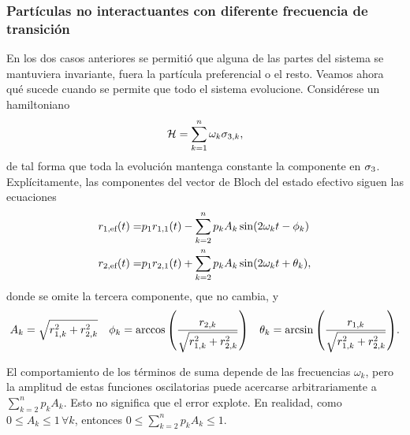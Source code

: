 \subsubsection{Partículas no interactuantes con diferente frecuencia de transición}

En los dos casos anteriores se permitió que alguna de las partes del sistema se mantuviera invariante, fuera la partícula preferencial o el resto. Veamos ahora qué sucede cuando se permite que todo el sistema evolucione. Considérese un hamiltoniano
\begin{equation}
    \mathcal{H}=\sum_{k=1}^{n}\omega_{k}\sigma_{3,k},\nonumber
\end{equation}
de tal forma que toda la evolución mantenga constante la componente en $\sigma_{3}$. Explícitamente, las componentes del vector de Bloch del estado efectivo siguen las ecuaciones
\begin{align}
    r_{1,\text{ef}}(t)=&p_{1}r_{1,1}(t)-\sum_{k=2}^{n}p_{k}A_{k}\sin(2\omega_{k} t-\phi_{k})\nonumber\\
    r_{2,\text{ef}}(t)=&p_{1}r_{2,1}(t)+\sum_{k=2}^{n}p_{k}A_{k}\sin(2\omega_{k} t+\theta_{k}),\nonumber
\end{align}
donde se omite la tercera componente, que no cambia, y
\begin{align}
    A_{k}=\sqrt{r_{1,k}^{2}+r_{2,k}^{2}} & & \phi_{k}=\arccos\qty(\frac{r_{2,k}}{\sqrt{r_{1,k}^{2}+r_{2,k}^{2}}}) & & \theta_{k}=\arcsin\qty(\frac{r_{1,k}}{\sqrt{r_{1,k}^{2}+r_{2,k}^{2}}}).\nonumber
\end{align}

El comportamiento de los términos de suma depende de las frecuencias $\omega_{k}$, pero la amplitud de estas funciones oscilatorias puede acercarse arbitrariamente a $\sum_{k=2}^{n} p_{k} A_{k}$. Esto no significa que el error explote. En realidad, como $0\leq A_{k}\leq 1\,\forall k$, entonces $0\leq\sum_{k=2}^{n} p_{k} A_{k}\leq 1$. 


